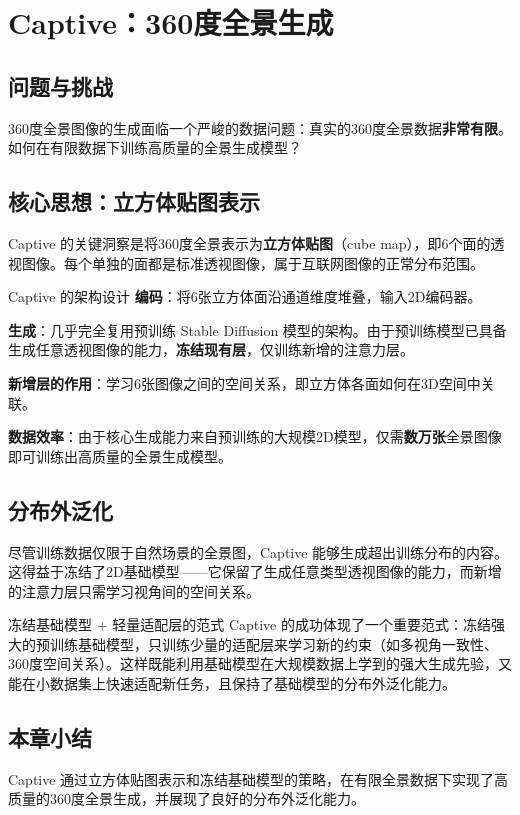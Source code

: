 \section{Captive：360度全景生成}

\subsection{问题与挑战}

360度全景图像的生成面临一个严峻的数据问题：真实的360度全景数据\textbf{非常有限}。如何在有限数据下训练高质量的全景生成模型？

\subsection{核心思想：立方体贴图表示}

Captive 的关键洞察是将360度全景表示为\textbf{立方体贴图}（cube map），即6个面的透视图像。每个单独的面都是标准透视图像，属于互联网图像的正常分布范围。

\begin{importantbox}{Captive 的架构设计}
\textbf{编码}：将6张立方体面沿通道维度堆叠，输入2D编码器。

\textbf{生成}：几乎完全复用预训练 Stable Diffusion 模型的架构。由于预训练模型已具备生成任意透视图像的能力，\textbf{冻结现有层}，仅训练新增的注意力层。

\textbf{新增层的作用}：学习6张图像之间的空间关系，即立方体各面如何在3D空间中关联。

\textbf{数据效率}：由于核心生成能力来自预训练的大规模2D模型，仅需\textbf{数万张}全景图像即可训练出高质量的全景生成模型。
\end{importantbox}

\subsection{分布外泛化}

尽管训练数据仅限于自然场景的全景图，Captive 能够生成超出训练分布的内容。这得益于冻结了2D基础模型——它保留了生成任意类型透视图像的能力，而新增的注意力层只需学习视角间的空间关系。

\begin{knowledgebox}{冻结基础模型 + 轻量适配层的范式}
Captive 的成功体现了一个重要范式：冻结强大的预训练基础模型，只训练少量的适配层来学习新的约束（如多视角一致性、360度空间关系）。这样既能利用基础模型在大规模数据上学到的强大生成先验，又能在小数据集上快速适配新任务，且保持了基础模型的分布外泛化能力。
\end{knowledgebox}

\subsection{本章小结}

Captive 通过立方体贴图表示和冻结基础模型的策略，在有限全景数据下实现了高质量的360度全景生成，并展现了良好的分布外泛化能力。

